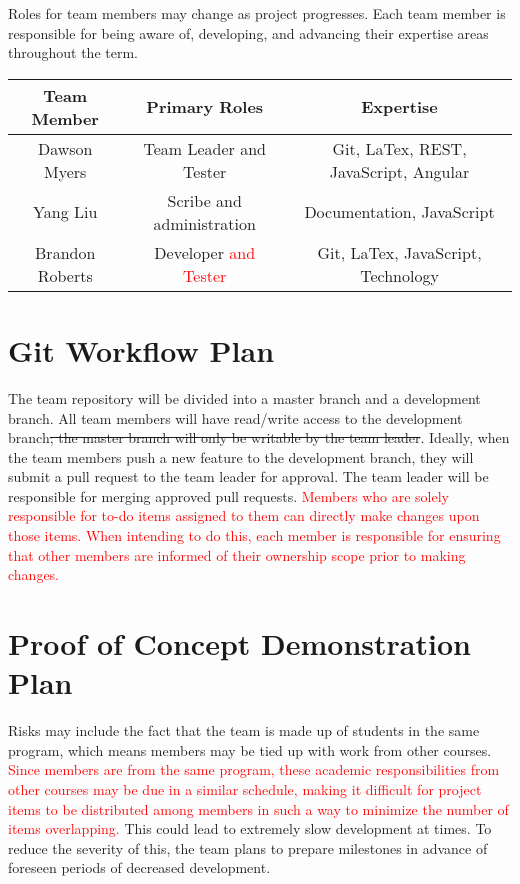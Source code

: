 \documentclass{article}
\begin{document}
Roles for team members may change as project progresses. Each team member is responsible for being aware of, developing, and advancing their expertise areas throughout the term.

\begin{center}
    \begin{tabular}{c | c | c}
         Team Member & Primary Roles & Expertise \\ 
         \hline
         Dawson Myers & Team Leader and Tester & Git, LaTex, REST, JavaScript, Angular \\  
         Yang Liu & Scribe and administration & Documentation, JavaScript \\
         Brandon Roberts & Developer \textcolor{red}{and Tester} & Git, LaTex, JavaScript, Technology \\
    \end{tabular}
\end{center}

\section{Git Workflow Plan}
The team repository will be divided into a master branch and a development branch. All team members will have read/write access to the development branch\sout{; the master branch will only be writable by the team leader}. Ideally, when the team members push a new feature to the development branch, they will submit a pull request to the team leader for approval. The team leader will be responsible for merging approved pull requests. \textcolor{red}{Members who are solely responsible for to-do items assigned to them can directly make changes upon those items. When intending to do this, each member is responsible for ensuring that other members are informed of their ownership scope prior to making changes.}

\section{Proof of Concept Demonstration Plan}
Risks may include the fact that the team is made up of students in the same program, which means members may be tied up with work from other courses. \textcolor{red}{Since members are from the same program, these academic responsibilities from other courses may be due in a similar schedule, making it difficult for project items to be distributed among members in such a way to minimize the number of items overlapping.} This could lead to extremely slow development at times. To reduce the severity of this, the team plans to prepare milestones in advance of foreseen periods of decreased development. 
\end{document}
